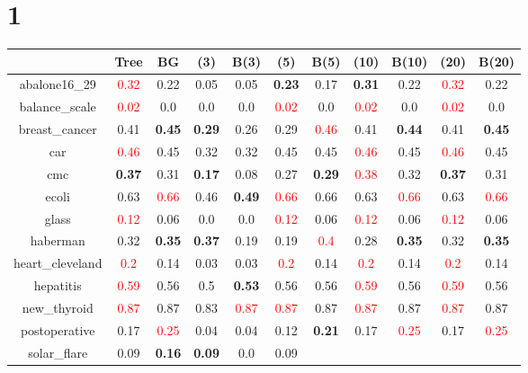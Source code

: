 \documentclass{article}%
\begin{document}
\section*{1}%
\begin{tabular}{c|cccccccccc}%
\hline%
&Tree&BG&(3)&B(3)&(5)&B(5)&(10)&B(10)&(20)&B(20)\\%
\hline%
abalone16\_29&\textcolor{red}{ 
0.32
}&0.22&0.05&0.05&\textbf{0.23}&0.17&\textbf{0.31}&0.22&\textcolor{red}{ 
0.32
}&0.22\\%
\hline%
balance\_scale&\textcolor{red}{ 
0.02
}&0.0&0.0&0.0&\textcolor{red}{ 
0.02
}&0.0&\textcolor{red}{ 
0.02
}&0.0&\textcolor{red}{ 
0.02
}&0.0\\%
\hline%
breast\_cancer&0.41&\textbf{0.45}&\textbf{0.29}&0.26&0.29&\textcolor{red}{ 
0.46
}&0.41&\textbf{0.44}&0.41&\textbf{0.45}\\%
\hline%
car&\textcolor{red}{ 
0.46
}&0.45&0.32&0.32&0.45&0.45&\textcolor{red}{ 
0.46
}&0.45&\textcolor{red}{ 
0.46
}&0.45\\%
\hline%
cmc&\textbf{0.37}&0.31&\textbf{0.17}&0.08&0.27&\textbf{0.29}&\textcolor{red}{ 
0.38
}&0.32&\textbf{0.37}&0.31\\%
\hline%
ecoli&0.63&\textcolor{red}{ 
0.66
}&0.46&\textbf{0.49}&\textcolor{red}{ 
0.66
}&0.66&0.63&\textcolor{red}{ 
0.66
}&0.63&\textcolor{red}{ 
0.66
}\\%
\hline%
glass&\textcolor{red}{ 
0.12
}&0.06&0.0&0.0&\textcolor{red}{ 
0.12
}&0.06&\textcolor{red}{ 
0.12
}&0.06&\textcolor{red}{ 
0.12
}&0.06\\%
\hline%
haberman&0.32&\textbf{0.35}&\textbf{0.37}&0.19&0.19&\textcolor{red}{ 
0.4
}&0.28&\textbf{0.35}&0.32&\textbf{0.35}\\%
\hline%
heart\_cleveland&\textcolor{red}{ 
0.2
}&0.14&0.03&0.03&\textcolor{red}{ 
0.2
}&0.14&\textcolor{red}{ 
0.2
}&0.14&\textcolor{red}{ 
0.2
}&0.14\\%
\hline%
hepatitis&\textcolor{red}{ 
0.59
}&0.56&0.5&\textbf{0.53}&0.56&0.56&\textcolor{red}{ 
0.59
}&0.56&\textcolor{red}{ 
0.59
}&0.56\\%
\hline%
new\_thyroid&\textcolor{red}{ 
0.87
}&0.87&0.83&\textcolor{red}{ 
0.87
}&\textcolor{red}{ 
0.87
}&0.87&\textcolor{red}{ 
0.87
}&0.87&\textcolor{red}{ 
0.87
}&0.87\\%
\hline%
postoperative&0.17&\textcolor{red}{ 
0.25
}&0.04&0.04&0.12&\textbf{0.21}&0.17&\textcolor{red}{ 
0.25
}&0.17&\textcolor{red}{ 
0.25
}\\%
\hline%
solar\_flare&0.09&\textbf{0.16}&\textbf{0.09}&0.0&0.09&\textcolor{red}{ 
}
\end{tabular}
\end{document}
